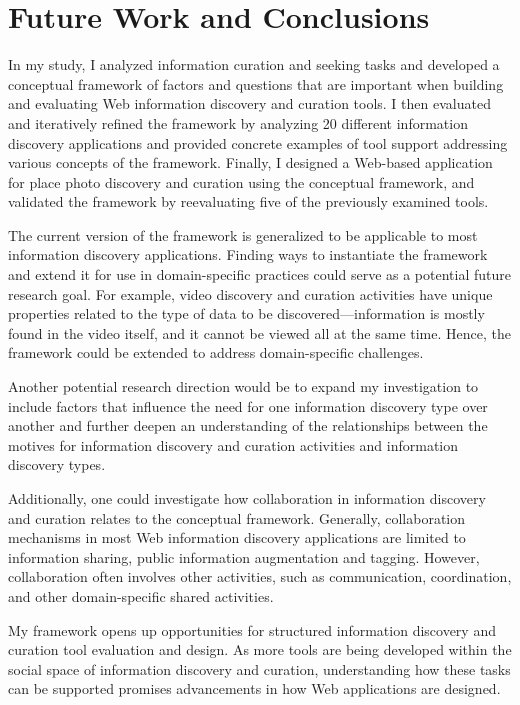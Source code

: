 \chapter{Future Work and Conclusions}
\label{chapter:future_work}


In my study, I analyzed information curation and seeking tasks and developed a conceptual framework of factors and questions that are important when building and evaluating Web information discovery and curation tools. I then evaluated and iteratively refined the framework by analyzing 20 different information discovery applications and provided concrete examples of tool support addressing various concepts of the framework. Finally, I designed a Web-based application for place photo discovery and curation using the conceptual framework, and validated the framework by reevaluating five of the previously examined tools.

The current version of the framework is generalized to be applicable to most information discovery applications. Finding ways to instantiate the framework and extend it for use in domain-specific practices could serve as a potential future research goal. For example, video discovery and curation activities have unique properties related to the type of data to be discovered---information is mostly found in the video itself, and it cannot be viewed all at the same time. Hence, the framework could be extended to address domain-specific challenges. 

Another potential research direction would be to expand my investigation to include factors that influence the need for one information discovery type over another and further deepen an understanding of the relationships between the motives for information discovery and curation activities and information discovery types. 

\pagebreak
Additionally, one could investigate how collaboration in information discovery and curation relates to the conceptual framework. Generally, collaboration mechanisms in most Web information discovery applications are limited to information sharing, public information augmentation and tagging. However, collaboration often involves other activities, such as communication, coordination, and other domain-specific shared activities.

My framework opens up opportunities for structured information discovery and curation tool evaluation and design. As more tools are being developed within the social space of information discovery and curation, understanding how these tasks can be supported promises advancements in how Web applications are designed.




